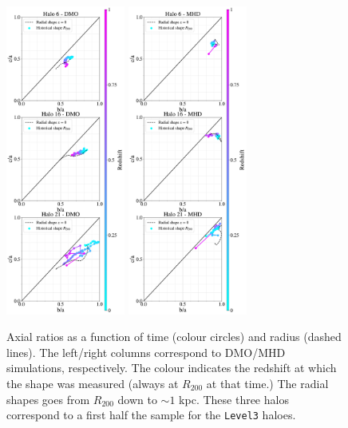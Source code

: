 \documentclass[a4paper,fleqn,usenatbib]{mnras}
\begin{document}
\begin{figure}
\begin{center}
\includegraphics[width=0.35\textwidth]{Z_Triax_level3_set_A_DM.pdf}
\includegraphics[width=0.35\textwidth]{Z_Triax_level3_set_A_MHD.pdf}
\end{center}
\caption{Axial ratios as a function of time (colour circles) and
  radius (dashed lines). 
  The left/right columns correspond to DMO/MHD simulations, respectively. 
  The colour indicates the redshift at which the shape was measured
  (always at $R_{200}$ at that time.)
  The radial shapes goes from $R_{200}$ down to $\sim 1$ kpc.
  These three halos correspond to a first half the sample for the \texttt{Level3}
  haloes. 
}
\label{fig:triaxial_history_A}
\end{figure}
\end{document}

